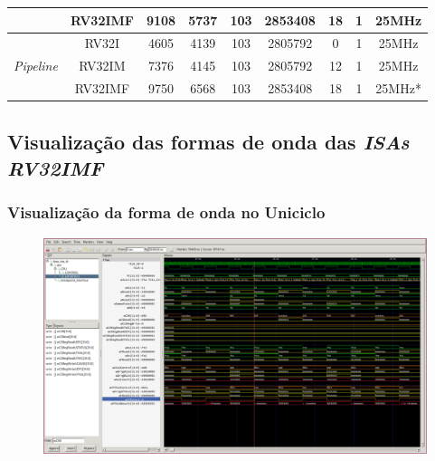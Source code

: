 \documentclass[aspectratio=169]{beamer}
\begin{document}
\begin{frame}
\begin{footnotesize}
\begin{longtable}{cc|c|c|c|c|c|c|c|}
            \cline{2-9}
            \multicolumn{1}{|c}{ }                                  & \multicolumn{1}{|c|}{RV32IMF} & 9108  & 5737  & 103   & 2853408   & 18    & 1     & 25MHz     \\
            \hline
            \multicolumn{1}{|c}{\multirow{3}{*}{\textit{Pipeline}}} & \multicolumn{1}{|c|}{RV32I}   & 4605  & 4139  & 103   & 2805792   & 0     & 1     & 25MHz     \\*
            \cline{2-9}
            \multicolumn{1}{|c}{ }                                  & \multicolumn{1}{|c|}{RV32IM}  & 7376  & 4145  & 103   & 2805792   & 12    & 1     & 25MHz     \\*
            \cline{2-9}
            \multicolumn{1}{|c}{ }                                  & \multicolumn{1}{|c|}{RV32IMF} & 9750  & 6568  & 103   & 2853408   & 18    & 1     & 25MHz*    \\
            \hline
        \end{longtable}
        \end{footnotesize}
        \vfill
    \end{frame}

    \subsection{Visualização das formas de onda das \textit{ISAs RV32IMF}}
    \begin{frame}
        \frametitle{Visualização da forma de onda no Uniciclo}
        \vfill
        \begin{figure}[H]
        \centering
            \includegraphics[width=.95\textwidth,height=.85\textheight,keepaspectratio]
            {../images/gtkwave/gtkwave_uni.png}
        \end{figure}
        \vfill
    \end{frame}
\end{document}
